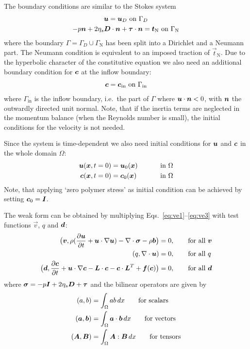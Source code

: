 The boundary conditions are similar to the Stokes system
\begin{gather}
    \boldsymbol{u} = \boldsymbol{u}_D\text{ on }\Gamma_D\\
    -p\boldsymbol{n}+2\eta_s \boldsymbol{D}\cdot\boldsymbol{n}+\boldsymbol{\tau}\cdot\boldsymbol{n}=
         \boldsymbol{t}_{\text{N}}\text{ on }\Gamma_{\text{N}}
\end{gather}
where the boundary $\Gamma=\Gamma_D\cup\Gamma_{\text{N}}$ has been split into a
Dirichlet and a Neumann part. The Neumann condition is equivalent
to an imposed traction of $\vec t_{\text{N}}$. Due to the hyperbolic character
of the constitutive equation we also need an additional boundary condition for
$\boldsymbol{c}$ at the inflow boundary:
\begin{equation}
   \boldsymbol{c} = \boldsymbol{c}_\text{in}\text{ on }\Gamma_\text{in}
    \label{eq:cinflow}
\end{equation}
where $\Gamma_\text{in}$ is the inflow boundary, i.e.\ the part of $\Gamma$
where $\boldsymbol{u}\cdot\boldsymbol{n}<0$, with $\boldsymbol{n}$ the outwardly directed unit normal.
Note, that if the inertia terms are neglected in the momentum balance
(when the Reynolds number is small), the initial conditions for the velocity is
not needed.
                                                                                
Since the system is time-dependent we also need initial conditions for $\boldsymbol{u}$
and $\boldsymbol{c}$ in the whole domain $\Omega$:
\begin{alignat}{2}
    \boldsymbol{u}(\boldsymbol{x},t=0) &= \boldsymbol{u}_0(\boldsymbol{x})\qquad&&\text{ in }\Omega\\
    \boldsymbol{c}(\boldsymbol{x},t=0) &= \boldsymbol{c}_0(\boldsymbol{x})&&\text{ in }\Omega
\end{alignat}
Note, that applying `zero polymer stress' as initial condition can be achieved
by setting $\boldsymbol{c}_0=\boldsymbol{I}$.

The weak form can be obtained by multiplying
Eqs.~\eqref{eq:ve1}--\eqref{eq:ve3}
with test functions $\vec v$, $q$ and $\boldsymbol{d}$:
\begin{align}
 \big(\boldsymbol{v},\rho(\dfrac{\partial \boldsymbol{u}}{\partial t}+\boldsymbol{u}\cdot\nabla\boldsymbol{u})
   -\nabla\cdot\boldsymbol{\sigma} -\rho\boldsymbol{b} \big)&=0,\qquad\text{for all }\boldsymbol{v}\\
  (q,\nabla\cdot\boldsymbol{u})& =0,\qquad\text{for all }q\\
 \big(\boldsymbol{d},\dfrac{\partial \boldsymbol{c}}{\partial t}
+\boldsymbol{u}\cdot\nabla\boldsymbol{c}-\boldsymbol{L}\cdot\boldsymbol{c}-\boldsymbol{c}\cdot\boldsymbol{L}^T
 +\boldsymbol{f}(\boldsymbol{c})\big)&= 0,\qquad\text{for all }\boldsymbol{d}
\end{align}
where $\boldsymbol{\sigma} = -p\boldsymbol{I}+2\eta_s\boldsymbol{D}+\boldsymbol{\tau}$ and
the bilinear operators are given by
\begin{align}
   (a,b)&=\int_\Omega a b\,d x\text\qquad\text{for scalars}\\
   (\boldsymbol{a}, \boldsymbol{b})&=\int_\Omega\boldsymbol{a}\cdot\boldsymbol{b}\,d x\qquad
     \text{for vectors }\\
   (\boldsymbol{A}, \boldsymbol{B})&=\int_\Omega\boldsymbol{A}:\boldsymbol{B}\,d x\qquad 
    \text{for tensors}
\end{align}

